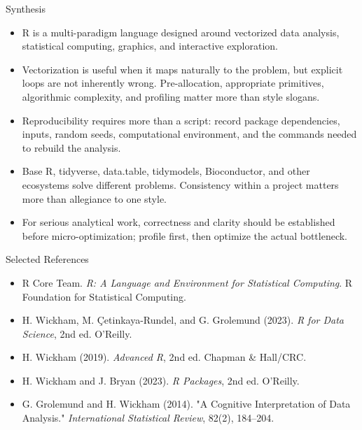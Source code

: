 \documentclass[aspectratio=169]{beamer}
\begin{document}
\begin{frame}{Synthesis}
  \begin{itemize}
    \item R is a multi-paradigm language designed around vectorized data analysis, statistical computing, graphics, and interactive exploration.
    \item Vectorization is useful when it maps naturally to the problem, but explicit loops are not inherently wrong. Pre-allocation, appropriate primitives, algorithmic complexity, and profiling matter more than style slogans.
    \item Reproducibility requires more than a script: record package dependencies, inputs, random seeds, computational environment, and the commands needed to rebuild the analysis.
    \item Base R, tidyverse, data.table, tidymodels, Bioconductor, and other ecosystems solve different problems. Consistency within a project matters more than allegiance to one style.
    \item For serious analytical work, correctness and clarity should be established before micro-optimization; profile first, then optimize the actual bottleneck.
  \end{itemize}
\end{frame}

\begin{frame}{Selected References}
  \small
  \begin{itemize}
    \item R Core Team. \textit{R: A Language and Environment for Statistical Computing}. R Foundation for Statistical Computing.
    \item H. Wickham, M. Çetinkaya-Rundel, and G. Grolemund (2023). \textit{R for Data Science}, 2nd ed. O'Reilly.
    \item H. Wickham (2019). \textit{Advanced R}, 2nd ed. Chapman \& Hall/CRC.
    \item H. Wickham and J. Bryan (2023). \textit{R Packages}, 2nd ed. O'Reilly.
    \item G. Grolemund and H. Wickham (2014). "A Cognitive Interpretation of Data Analysis." \textit{International Statistical Review}, 82(2), 184--204.
  \end{itemize}
\end{frame}

\contactslide
\end{document}
